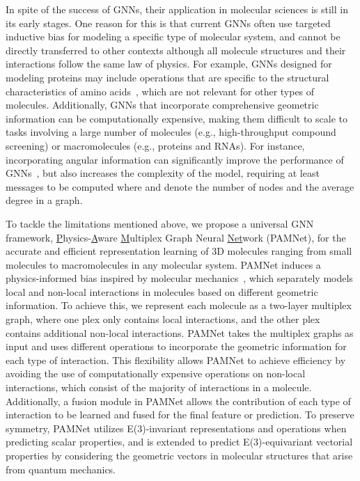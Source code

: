 \documentclass[fleqn,10pt]{wlscirep}
\newcommand{\method}{PAMNet\xspace}
\begin{document}
In spite of the success of GNNs, their application in molecular sciences is still in its early stages. One reason for this is that current GNNs often use targeted inductive bias for modeling a specific type of molecular system, and cannot be directly transferred to other contexts although all molecule structures and their interactions follow the same law of physics. For example, GNNs designed for modeling proteins may include operations that are specific to the structural characteristics of amino acids~\cite{jumper2021highly,baek2021accurate}, which are not relevant for other types of molecules.
Additionally, GNNs that incorporate comprehensive geometric information can be computationally expensive, making them difficult to scale to tasks involving a large number of molecules (e.g., high-throughput compound screening) or macromolecules (e.g., proteins and RNAs). For instance, incorporating angular information can significantly improve the performance of GNNs~\cite{klicpera_dimenet_2020,klicpera_dimenetpp_2020,shui2020heterogeneous,li2021structure}, but also increases the complexity of the model, requiring at least  messages to be computed where  and  denote the number of nodes and the average degree in a graph.

To tackle the limitations mentioned above, we propose a universal GNN framework, \underline{P}hysics-\underline{A}ware \underline{M}ultiplex Graph Neural \underline{Net}work (\method), for the accurate and efficient representation learning of 3D molecules ranging from small molecules to macromolecules in any molecular system. \method induces a physics-informed bias inspired by molecular mechanics~\cite{schlick2010molecular}, which separately models local and non-local interactions in molecules based on different geometric information. To achieve this, we represent each molecule as a two-layer multiplex graph, where one plex only contains local interactions, and the other plex contains additional non-local interactions. \method takes the multiplex graphs as input and uses different operations to incorporate the geometric information for each type of interaction. This flexibility allows \method to achieve efficiency by avoiding the use of computationally expensive operations on non-local interactions, which consist of the majority of interactions in a molecule. Additionally, a fusion module in \method allows the contribution of each type of interaction to be learned and fused for the final feature or prediction. To preserve symmetry, \method utilizes E(3)-invariant representations and operations when predicting scalar properties, and is extended to predict E(3)-equivariant vectorial properties by considering the geometric vectors in molecular structures that arise from quantum mechanics.
\end{document}
